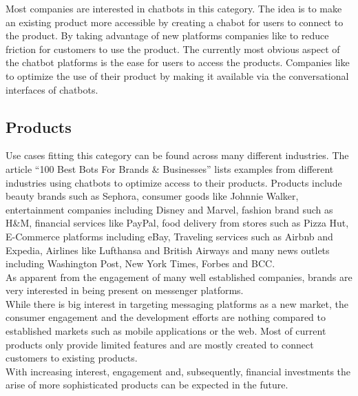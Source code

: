 Most companies are interested in chatbots in this category. The idea is to make an existing product more accessible by creating a chabot for users to connect to the product. By taking advantage of new platforms companies like to reduce friction for customers to use the product. The currently most obvious aspect of the chatbot platforms is the ease for users to access the products. Companies like to optimize the use of their product by making it available via the conversational interfaces of chatbots.
\\

\subsection{Products}

Use cases fitting this category can be found across many different industries. The article ``100 Best Bots For Brands \& Businesses''\cite{topbots} lists examples from different industries using chatbots to optimize access to their products. Products include beauty brands such as Sephora, consumer goods like Johnnie Walker, entertainment companies including Disney and Marvel, fashion brand such as H\&M, financial services like PayPal, food delivery from stores such as Pizza Hut, E-Commerce platforms including eBay, Traveling services such as Airbnb and Expedia, Airlines like Lufthansa and British Airways and many news outlets including Washington Post, New York Times, Forbes and BCC.
\\


As apparent from the engagement of many well established companies, brands are very interested in being present on messenger platforms.
\\

While there is big interest in targeting messaging platforms as a new market, the consumer engagement and the development efforts are nothing compared to established markets such as mobile applications or the web. Most of current products only provide limited features and are mostly created to connect customers to existing products.
\\

With increasing interest, engagement and, subsequently, financial investments the arise of more sophisticated products can be expected in the future.

